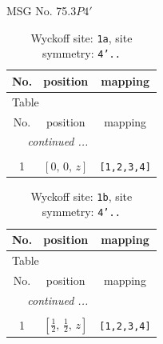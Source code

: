 \documentclass[fleqn,8pt]{jsarticle}
\begin{document}
\setcounter{MaxMatrixCols}{32}

\renewcommand{\tablename}{Table~}
\renewcommand{\figurename}{Figure~}
\begin{center}
\LARGE
MSG No. 75.3\quad$P4'$
\end{center}
\renewcommand{\arraystretch}{1.2}
\begin{longtable}{ccc}
\caption{Wyckoff site: {\tt 1a}, site symmetry: {\tt 4'..}}
 \\
 \hline \hline
No. & position & mapping \\ \hline \endfirsthead

\multicolumn{2}{l}{\tablename\ \thetable{}} \\
 \hline \hline
No. & position & mapping \\ \hline \endhead

 \hline \hline
\multicolumn{2}{r}{\footnotesize\it continued ...} \\ \endfoot

 \hline \hline
\multicolumn{2}{r}{} \\ \endlastfoot

1 & $\left[ 0,\, 0,\, z \right]$ & {\tt [1,2,3,4]} \\
\end{longtable}
\renewcommand{\arraystretch}{1.2}
\begin{longtable}{ccc}
\caption{Wyckoff site: {\tt 1b}, site symmetry: {\tt 4'..}}
 \\
 \hline \hline
No. & position & mapping \\ \hline \endfirsthead

\multicolumn{2}{l}{\tablename\ \thetable{}} \\
 \hline \hline
No. & position & mapping \\ \hline \endhead

 \hline \hline
\multicolumn{2}{r}{\footnotesize\it continued ...} \\ \endfoot

 \hline \hline
\multicolumn{2}{r}{} \\ \endlastfoot

1 & $\left[ \frac{1}{2},\, \frac{1}{2},\, z \right]$ & {\tt [1,2,3,4]} \\
\end{longtable}
\renewcommand{\arraystretch}{1.2}
\end{document}
